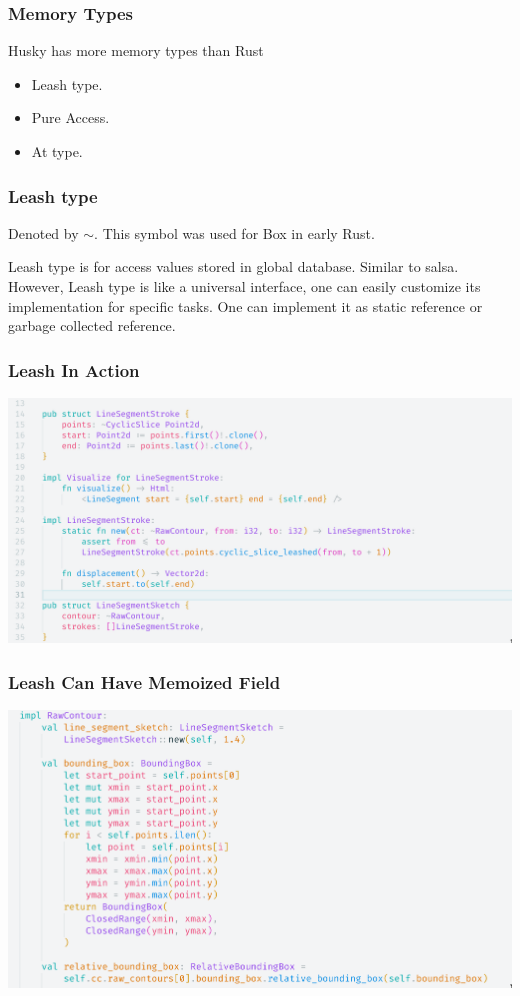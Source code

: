 \documentclass{beamer}   	%
\theoremstyle{definition}
\begin{document}
\begin{frame}
\frametitle{Memory Types}
Husky has more memory types than Rust
\begin{itemize}
	\item Leash type.
	\item Pure Access.
	\item At type.
\end{itemize}
\end{frame}

\begin{frame}
\frametitle{Leash type}
Denoted by $\sim$. This symbol was used for Box in early Rust.

Leash type is for access values stored in global database. Similar to salsa. However, Leash type is like a universal interface, one can easily customize its implementation for specific tasks. One can implement it as static reference or garbage collected reference.
\end{frame}

\begin{frame}
\frametitle{Leash In Action}
\includegraphics[width=\linewidth]{snapshots/husky_leash_in_action.png}
\end{frame}

\begin{frame}
\frametitle{Leash Can Have Memoized Field}
\includegraphics[width=\linewidth]{snapshots/husky_memoized_field.png}
\end{frame}
\end{document}
